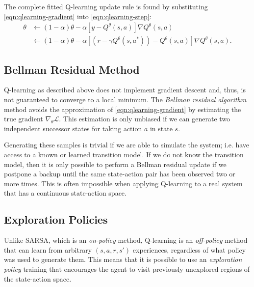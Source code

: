 \documentclass[11pt]{article}
\numberwithin{equation}{section}
\numberwithin{figure}{section}
\begin{document}
The complete fitted Q-learning update rule is found by substituting
\cref{eqn:qlearning-gradient} into \cref{eqn:qlearning-step}:
\begin{align*}
    \theta &\gets (1 - \alpha) \theta - \alpha \left[
                y - Q^\theta(s, a)\right] \nabla Q^\theta (s, a) \\
           &\gets (1 - \alpha) \theta - \alpha \left[
                \left( r - \gamma Q^\theta(s, a^*) \right)
                - Q^\theta(s, a)\right] \nabla Q^\theta (s, a).
\end{align*}

\subsection{Bellman Residual Method}
Q-learning as described above does not implement gradient descent and, thus, is
not guaranteed to converge to a local minimum. The \emph{Bellman residual
algorithm} method avoids the approximation of \cref{eqn:qlearning-gradient} by
estimating the true gradient $\nabla_\theta \mathcal{L}$. This estimation is
only unbiased if we can generate two independent successor states for taking
action $a$ in state $s$.

Generating these samples is trivial if we are able to simulate the system; i.e.
have access to a known or learned transition model. If we do not know the
transition model, then it is only possible to perform a Bellman residual update
if we postpone a backup until the same state-action pair has been observed two
or more times. This is often impossible when applying Q-learning to a real system
that has a continuous state-action space.


\subsection{Exploration Policies}
Unlike SARSA, which is an \emph{on-policy} method,  Q-learning is an
\emph{off-policy} method that can learn from arbitrary $(s, a, r, s')$
experiences, regardless of what policy was used to generate them. This means
that it is possible to use an \emph{exploration policy} training that
encourages the agent to visit previously unexplored regions of the state-action
space.
\end{document}
